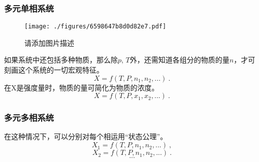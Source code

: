 \subsubsection{多元单相系统}
\begin{figure}[ht]
\centering
\texttt{[image: ./figures/6598647b8d0d82e7.pdf]}
\caption{请添加图片描述} \label{fig_statef_2}
\end{figure}
如果系统中还包括多种物质，那么除$p$, $T$外，还需知道各组分的物质的量$n$，才可刻画这个系统的一切宏观特征。
\begin{equation}
X=f(T,P,n_1, n_2, ...)~.
\end{equation}
在X是强度量时，物质的量可简化为物质的浓度。
\begin{equation}
X=f(T,P,x_1, x_2, ...)~.
\end{equation}

\subsubsection{多元多相系统}
在这种情况下，可以分别对每个相运用“状态公理”。
\begin{equation}
X_1=f(T,P,n_1, n_2, ...)~,
\end{equation}
\begin{equation}
X_2=f(T,P,n_1, n_2, ...)~.
\end{equation}
$$...$$
